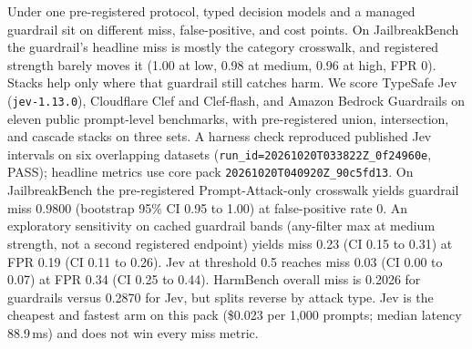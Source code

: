 Under one pre-registered protocol, typed decision models and a managed guardrail sit on different miss, false-positive, and cost points.
On JailbreakBench the guardrail's headline miss is mostly the category crosswalk, and registered strength barely moves it (1.00 at low, 0.98 at medium, 0.96 at high, FPR 0).
Stacks help only where that guardrail still catches harm.
We score TypeSafe Jev (\texttt{jev-1.13.0}), Cloudflare Clef and Clef-flash, and Amazon Bedrock Guardrails on eleven public prompt-level benchmarks, with pre-registered union, intersection, and cascade stacks on three sets.
A harness check reproduced published Jev intervals on six overlapping datasets (\texttt{run\_id=20261020T033822Z\_0f24960e}, PASS); headline metrics use core pack \texttt{20261020T040920Z\_90c5fd13}.
On JailbreakBench the pre-registered Prompt-Attack-only crosswalk yields guardrail miss 0.9800 (bootstrap 95\% CI 0.95 to 1.00) at false-positive rate 0.
An exploratory sensitivity on cached guardrail bands (any-filter max at medium strength, not a second registered endpoint) yields miss 0.23 (CI 0.15 to 0.31) at FPR 0.19 (CI 0.11 to 0.26).
Jev at threshold 0.5 reaches miss 0.03 (CI 0.00 to 0.07) at FPR 0.34 (CI 0.25 to 0.44).
HarmBench overall miss is 0.2026 for guardrails versus 0.2870 for Jev, but splits reverse by attack type.
Jev is the cheapest and fastest arm on this pack (\$0.023 per 1{,}000 prompts; median latency 88.9\,ms) and does not win every miss metric.
